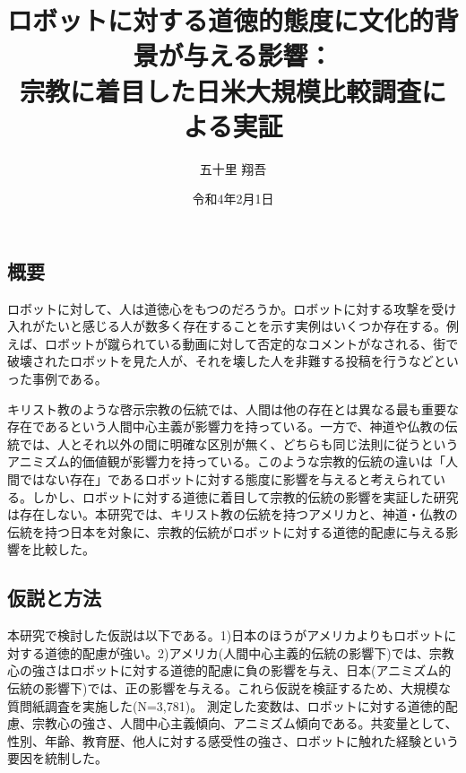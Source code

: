 \documentclass[twocolumn, a4j,10pt]{jarticle}
\title{ロボットに対する道徳的態度に文化的背景が与える影響：\\宗教に着目した日米大規模比較調査による実証}
\author{五十里 翔吾}
\date{令和4年2月1日}
\begin{document}
\maketitle
\vspace{-7mm}
\subsection*{概要}\vspace{-3mm}
ロボットに対して、人は道徳心をもつのだろうか。ロボットに対する攻撃を受け入れがたいと感じる人が数多く存在することを示す実例はいくつか存在する。例えば、ロボットが蹴られている動画に対して否定的なコメントがなされる、街で破壊されたロボットを見た人が、それを壊した人を非難する投稿を行うなどといった事例である。


キリスト教のような啓示宗教の伝統では、人間は他の存在とは異なる最も重要な存在であるという人間中心主義が影響力を持っている。一方で、神道や仏教の伝統では、人とそれ以外の間に明確な区別が無く、どちらも同じ法則に従うというアニミズム的価値観が影響力を持っている。このような宗教的伝統の違いは「人間ではない存在」であるロボットに対する態度に影響を与えると考えられている。しかし、ロボットに対する道徳に着目して宗教的伝統の影響を実証した研究は存在しない。本研究では、キリスト教の伝統を持つアメリカと、神道・仏教の伝統を持つ日本を対象に、宗教的伝統がロボットに対する道徳的配慮に与える影響を比較した。
\vspace{-7mm}
\subsection*{仮説と方法} \vspace{-3mm}
本研究で検討した仮説は以下である。1)日本のほうがアメリカよりもロボットに対する道徳的配慮が強い。2)アメリカ(人間中心主義的伝統の影響下)では、宗教心の強さはロボットに対する道徳的配慮に負の影響を与え、日本(アニミズム的伝統の影響下)では、正の影響を与える。これら仮説を検証するため、大規模な質問紙調査を実施した(N=3,781)。
測定した変数は、ロボットに対する道徳的配慮、宗教心の強さ、人間中心主義傾向、アニミズム傾向である。共変量として、性別、年齢、教育歴、他人に対する感受性の強さ、ロボットに触れた経験という要因を統制した。
\vspace{-7mm}
\end{document}
